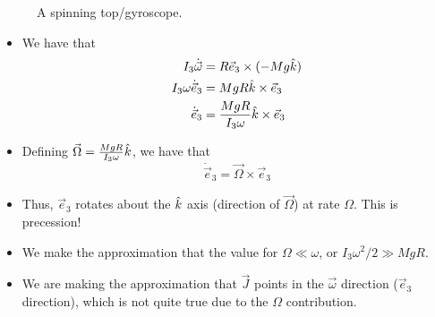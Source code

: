 \documentclass[../notes.tex]{subfiles}
\begin{document}
\begin{itemize}
\begin{figure}[h!]
        \caption{A spinning top/gyroscope.}
        \label{fig:topGyroscope}
    \end{figure}
    \begin{itemize}
        \item We have that
        \begin{align*}
            I_3\dot{\vec{\omega}} &= R\vec{e}_3\times(-Mg\hat{k})\\
            I_3\omega\dot{\vec{e}}_3 &= MgR\hat{k}\times\vec{e}_3\\
            \dot{\vec{e}}_3 &= \frac{MgR}{I_3\omega}\hat{k}\times\vec{e}_3
        \end{align*}
        \item Defining $\vec{\Omega}=\frac{MgR}{I_3\omega}\hat{k}$, we have that
        \begin{equation*}
            \dot{\vec{e}}_3 = \vec{\Omega}\times\vec{e}_3
        \end{equation*}
        \item Thus, $\vec{e}_3$ rotates about the $\hat{k}$ axis (direction of $\vec{\Omega}$) at rate $\Omega$. This is precession!
        \item We make the approximation that the value for $\Omega\ll\omega$, or $I_3\omega^2/2\gg MgR$.
        \item We are making the approximation that $\vec{J}$ points in the $\vec{\omega}$ direction ($\vec{e}_3$ direction), which is not quite true due to the $\Omega$ contribution.
    \end{itemize}
\end{itemize}
\end{document}

